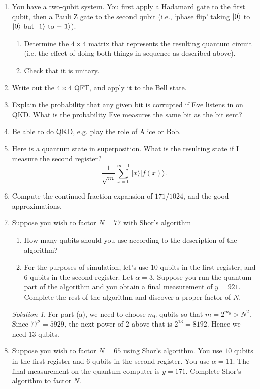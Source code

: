 \documentclass{article}
\theoremstyle{plain}
\theoremstyle{definition}
\theoremstyle{remark}
\newtheorem*{solution}{Solution}
\numberwithin{theorem}{section}
\begin{document}
\begin{enumerate}
    \item You have a two-qubit system.  You first apply a Hadamard gate to the first qubit, then a Pauli Z gate to the second qubit (i.e., `phase flip' taking $|0 \rangle$ to $|0 \rangle$ but $|1\rangle$ to $-|1\rangle$).
    \begin{enumerate}
        \item Determine the $4 \times 4$ matrix that represents the resulting quantum circuit (i.e. the effect of doing both things in sequence as described above).
        \item Check that it is unitary.
    \end{enumerate}
    \item Write out the $4 \times 4$ QFT, and apply it to the Bell state.
    \item Explain the probability that any given bit is corrupted if Eve listens in on QKD.  What is the probability Eve measures the same bit as the bit sent?
    \item Be able to do QKD, e.g. play the role of Alice or Bob.
    \item Here is a quantum state in superposition.  What is the resulting state if I measure the second register?
    \[
    \frac{1}{\sqrt{m}} \sum_{x=0}^{m-1} |x\rangle |f(x) \rangle.
    \]
    \item Compute the continued fraction expansion of $171/1024$, and the good approximations.
    \item Suppose you wish to factor $N=77$ with Shor's algorithm
    \begin{enumerate}
        \item How many qubits should you use according to the description of the algorithm?
        \item For the purposes of simulation, let's use $10$ qubits in the first register, and $6$ qubits in the second register.
        Let $\alpha = 3$.  Suppose you run the quantum part of the algorithm and you obtain a final measurement of $y=921$.  Complete the rest of the algorithm and discover a proper factor of $N$.
    \end{enumerate}

    \begin{solution}
    For part (a), we need to choose $m_0$ qubits so that $m = 2^{m_0} > N^2$.  Since $77^2 = 5929$, the next power of $2$ above that is $2^{13} = 8192$.  Hence we need $13$ qubits.
    \end{solution}

    \item Suppose you wish to factor $N=65$ using Shor's algorithm.  You use $10$ qubits in the first register and $6$ qubits in the second register.  You use $\alpha = 11$.  The final measurement on the quantum computer is $y=171$.  Complete Shor's algorithm to factor $N$.


\end{enumerate}
\end{document}
